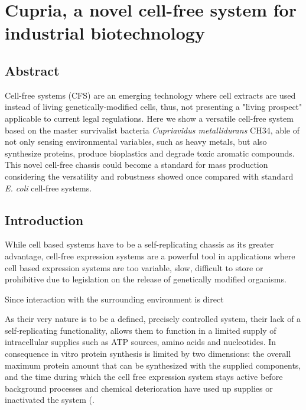 \chapter{Cupria, a novel cell-free system for industrial biotechnology}

\section{\textbf{Abstract }}

Cell-free systems (CFS) are an emerging technology where cell extracts are used instead 
of living genetically-modified cells, thus, not presenting a "living prospect" applicable 
to current legal regulations.  Here we show a versatile cell-free system based on the master 
survivalist bacteria \textit{Cupriavidus  metallidurans} CH34, able of not only sensing environmental 
variables, such as heavy metals, but also synthesize proteins, produce bioplastics and degrade toxic aromatic compounds. 
This novel cell-free  chassis  could  become  a  standard  for  mass production considering the versatility and robustness 
showed once compared with standard \textit{E. coli} cell-free systems. 



\section{\textbf{Introduction }}

While cell based systems have to be a self-replicating chassis as its greater advantage, cell-free expression systems are a powerful tool in applications where cell based expression systems are too variable, slow, difficult to store or prohibitive due to legislation on the release of genetically modified organisms. 

Since interaction with the surrounding environment is direct

As their very nature is to be a defined, precisely controlled system, their lack of a self-replicating functionality, allows them to function in a limited supply of intracellular supplies such as ATP sources, amino acids and nucleotides. In consequence in vitro protein synthesis is limited by two dimensions: the overall maximum protein amount that can be synthesized with the supplied components, and the time during which the cell free expression system stays active before background processes and chemical deterioration have used up supplies or inactivated the system (\cite{carlson2012cell,bernhard2013cell,kwon2015high}.
